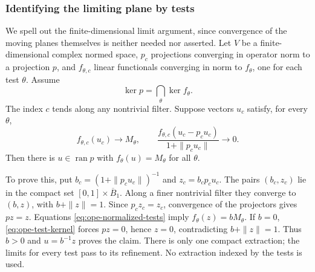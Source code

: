 \subsubsection{Identifying the limiting plane by tests}
We spell out the finite-dimensional limit argument, since convergence
of the moving planes themselves is neither needed nor asserted.
Let $V$ be a finite-dimensional complex normed space, $p_c$ projections
converging in operator norm to a projection $p$, and $f_{\theta,c}$
linear functionals converging in norm to $f_\theta$, one for each test
$\theta$. Assume
\begin{equation}\label{eq:ope-test-kernel}
 \ker p=\bigcap_\theta\ker f_\theta.
\end{equation}
The index $c$ tends along any nontrivial filter. Suppose vectors $u_c$
satisfy, for every $\theta$,
\begin{equation}\label{eq:ope-normalized-tests}
 f_{\theta,c}(u_c)\longrightarrow M_\theta,\qquad
 \frac{f_{\theta,c}(u_c-p_cu_c)}{1+\|p_cu_c\|}\longrightarrow0.
\end{equation}
Then there is $u\in\operatorname{ran}p$ with
$f_\theta(u)=M_\theta$ for all $\theta$.

To prove this, put $b_c=(1+\|p_cu_c\|)^{-1}$ and $z_c=b_cp_cu_c$.
The pairs $(b_c,z_c)$ lie in the compact set $[0,1]\times\overline B_1$.
Along a finer nontrivial filter they converge to $(b,z)$, with
$b+\|z\|=1$. Since $p_cz_c=z_c$, convergence of the projectors gives
$pz=z$. Equations \eqref{eq:ope-normalized-tests} imply
$f_\theta(z)=bM_\theta$. If $b=0$, \eqref{eq:ope-test-kernel} forces
$pz=0$, hence $z=0$, contradicting $b+\|z\|=1$. Thus $b>0$ and
$u=b^{-1}z$ proves the claim. There is only one compact extraction;
the limits for every test pass to its refinement. No extraction indexed
by the tests is used.

